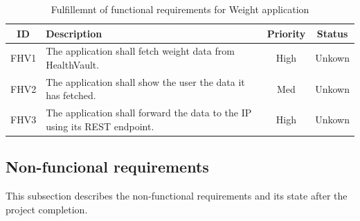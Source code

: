 \begin{table}[H]
\begin{center}
\begin{tabular}{ | c | p{9cm} | c | c |}
  \hline
  ID & Description & Priority & Status\\
  \hline\noalign{\smallskip}\noalign{\smallskip}\hline
  FHV1	& The application shall fetch weight data from HealthVault.						      & High & Unkown \\
  FHV2	& The application shall show the user the data it has fetched.              & Med & Unkown \\
  FHV3	& The application shall forward the data to the IP using its REST endpoint. & High & Unkown \\
  \hline
\end{tabular}
\end{center}
\caption{Fulfillemnt of functional requirements for Weight application}
\label{table:fulfillemntweightapp}
\end{table}

\subsection{Non-funcional requirements}
This subsection describes the non-functional requirements and its state after the project completion. 

